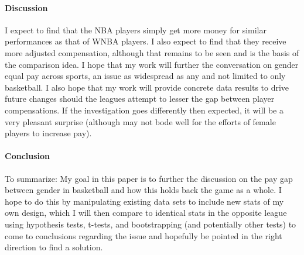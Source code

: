 \documentclass[12pt]{article}
\begin{document}
\paragraph{Discussion}
I expect to find that the NBA players simply get more money for similar performances as that of WNBA 
players. I also expect to find that they receive more adjusted compensation, although that remains to 
be seen and is the basis of the comparison idea. I hope that my work will further the conversation on 
gender equal pay across sports, an issue as widespread as any and not limited to only basketball. 
I also hope that my work will provide concrete data results to drive future changes should the leagues 
attempt to lesser the gap between player compensations. If the investigation goes differently then 
expected, it will be a very pleasant surprise (although may not bode well for the efforts of female 
players to increase pay).

\paragraph{Conclusion}
To summarize: My goal in this paper is to further the discussion on the pay gap between gender 
in basketball and how this holds back the game as a whole. I hope to do this by manipulating 
existing data sets to include new stats of my own design, which I will then compare to identical 
stats in the opposite league using hypothesis tests, t-tests, and bootstrapping (and potentially 
other tests) to come to conclusions regarding the issue and hopefully be pointed in the right 
direction to find a solution.




\end{document}
